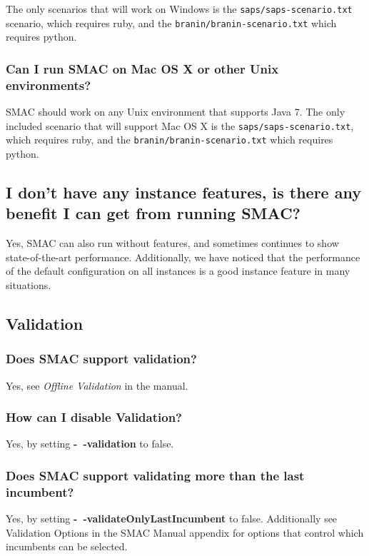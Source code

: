 \documentclass[11pt,letterpaper,oneside]{article}
\begin{document}
	The only scenarios that will work on Windows is the \texttt{saps/saps-scenario.txt} scenario, which requires ruby, and the \texttt{branin/branin-scenario.txt} which requires python.

\subsubsection{Can I run SMAC on Mac OS X or other Unix environments?}

	SMAC should work on any Unix environment that supports Java 7. The only included scenario that will support Mac OS X is the \texttt{saps/saps-scenario.txt}, which requires ruby, and the  \texttt{branin/branin-scenario.txt} which requires python.
 
\subsection{I don't have any instance features, is there any benefit I can get from running SMAC?}

	Yes, SMAC can also run without features, and sometimes continues to show state-of-the-art performance. Additionally, we have noticed that the performance of the default configuration on all instances is a good instance feature in many situations.


\subsection{Validation}

\subsubsection{Does SMAC support validation?}

	Yes, see \emph{Offline Validation} in the manual.

	
\subsubsection{How can I disable Validation?}

	Yes, by setting \textbf{-~$\!$-validation} to false.
	
\subsubsection{Does SMAC support validating more than the last incumbent?}

	Yes, by setting \textbf{-~$\!$-validateOnlyLastIncumbent} to false. Additionally see {Validation Options} in the SMAC Manual appendix for options that control which incumbents can be selected.
\end{document}
